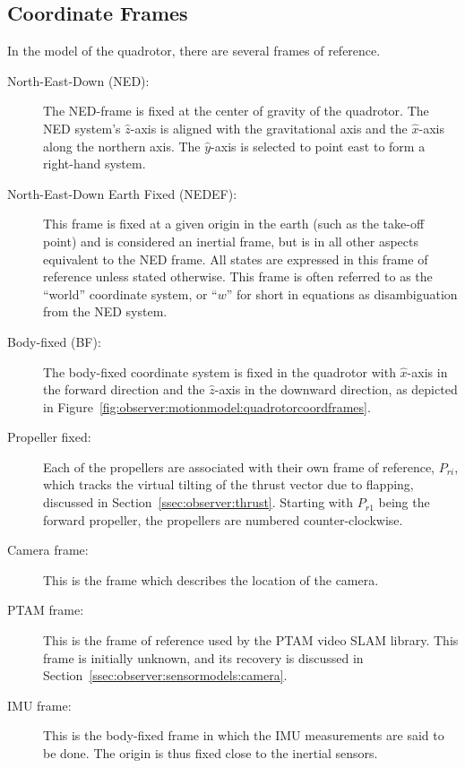     \subsection{Coordinate Frames}
        In the model of the quadrotor, there are several frames of reference.
        \begin{description}
            \item[North-East-Down (NED):]
            The NED-frame is fixed at the center of gravity of the quadrotor.
            The NED system's $\hat{z}$-axis is aligned with the gravitational axis and
            the $\hat{x}$-axis along the northern axis.
            The $\hat{y}$-axis is selected to point east to form a right-hand system.

            \item[North-East-Down Earth Fixed (NEDEF):] This frame is fixed at
            a given origin in the earth (such as the take-off point) and is
            considered an inertial frame, but is in all
            other aspects equivalent to the NED frame.
            All states are expressed in this frame of reference unless stated otherwise.
            This frame is often referred to as the ``world'' coordinate system,
            or ``$w$'' for short in equations as disambiguation from the NED system.

            \item[Body-fixed (BF):] The body-fixed coordinate system is fixed in the
            quadrotor with $\hat{x}$-axis in the forward direction and the $\hat{z}$-axis in the downward
            direction, as depicted in Figure~\ref{fig:observer:motionmodel:quadrotorcoordframes}.

            \item[Propeller fixed:] Each of the propellers are associated
            with their own frame of reference, $P_{ri}$, which tracks the
            virtual tilting of the thrust vector due to flapping,
            discussed in Section~\ref{ssec:observer:thrust}.
            Starting with $P_{r1}$ being the forward propeller, the propellers
            are numbered counter-clockwise.

            \item[Camera frame:] This is the frame which describes the
            location of the camera.

            \item[PTAM frame:] This is the frame of reference used by the PTAM video SLAM library.
            This frame is initially unknown, and its recovery is discussed in Section~\ref{ssec:observer:sensormodels:camera}.

            \item[IMU frame:] This is the body-fixed frame in which the IMU measurements are said
            to be done. The origin is thus fixed close to the inertial sensors.
        \end{description}
